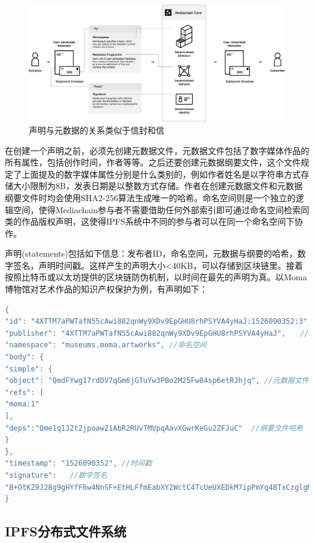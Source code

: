 \documentclass[withoutpreface,bwprint]{cumcmthesis} %
\begin{document}
\begin{figure}[!h]
	\centering
	\includegraphics[width=.8\textwidth]{mc-stack.png}
	\caption{声明与元数据的关系类似于信封和信}
\end{figure}

在创建一个声明之前，必须先创建元数据文件，元数据文件包括了数字媒体作品的所有属性，包括创作时间，作者等等。之后还要创建元数据纲要文件，这个文件规定了上面提及的数字媒体属性分别是什么类别的，例如作者姓名是以字符串方式存储大小限制为8B，发表日期是以整数方式存储。作者在创建元数据文件和元数据纲要文件时均会使用SHA2-256算法生成唯一的哈希。命名空间则是一个独立的逻辑空间，使得Mediachain参与者不需要借助任何外部索引即可通过命名空间检索同类的作品版权声明，这使得IPFS系统中不同的参与者可以在同一个命名空间下协作。

声明(statements)包括如下信息：发布者ID，命名空间，元数据与纲要的哈希，数字签名，声明时间戳。这样产生的声明大小<40KB，可以存储到区块链里。接着按照比特币或以太坊提供的区块链防伪机制，以时间在最先的声明为真。以Moma博物馆对艺术作品的知识产权保护为例，有声明如下：

\begin{lstlisting}[language=C]
{
"id": "4XTTM7aPWTafN55cAwi882qnWy9XDv9EpGHU8rhPSYVA4yHaJ:1526090352:3", //声明ID
"publisher": "4XTTM7aPWTafN55cAwi882qnWy9XDv9EpGHU8rhPSYVA4yHaJ",　　//发布者ID
"namespace": "museums.moma.artworks", //命名空间
"body": {
"simple": {
"object": "QmdFYwg17rdDV7qGm6jGTuYw3PBo2M25Fw84sp6etRJhjq", //元数据文件哈希
"refs": [
"moma:1"
],
"deps":"Qme1q1J2t2jpoaw21AbR2RUvTMVpqAavXGwrKeGu2ZFJuC"  //纲要文件哈希
}
},
"timestamp": "1526090352", //时间戳
"signature":   //数字签名
"B+OtKZ9J28g9gHYfF6w4NnSF+EtHLFfmEabXY2WctC4TcUeUXEDkM7ipPmYq48TxCzglgMe1C0b4aDQxZSS8AQ==" 
}

\end{lstlisting}


\subsection{IPFS分布式文件系统}
\end{document}
